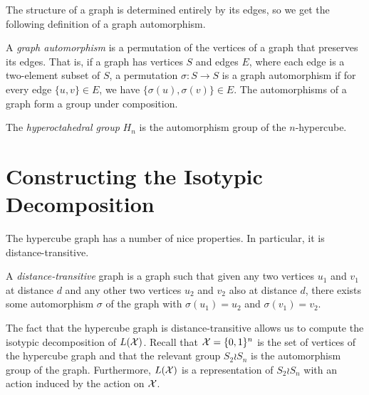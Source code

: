 \documentclass[cclicense]{hmcthesis}
\numberwithin{equation}{chapter}
\numberwithin{ucounter}{chapter}
\begin{document}
    The structure of a graph is determined entirely by its edges, so we get the
    following definition of a graph automorphism.
    \begin{definition}
        A \emph{graph automorphism} is a permutation of the vertices of a graph
        that preserves its edges.  That is, if a graph has vertices $S$ and
        edges $E$, where each edge is a two-element subset of $S$, a permutation
        $\sigma: S \to S$ is a graph automorphism if for every edge $\{u, v\}
        \in E$, we have \mbox{$\{\sigma(u), \sigma(v)\} \in E$}.  The automorphisms of
        a graph form a group under composition.
    \end{definition}

    \begin{definition}
        The \emph{hyperoctahedral group} $H_n$ is the automorphism group of the
        $n$-hypercube.
    \end{definition}

\section{Constructing the Isotypic Decomposition}
    \label{sec:construct-isotypic}
    The hypercube graph has a number of nice properties.  In particular, it is
    distance-transitive. 
    \begin{definition}
        A \emph{distance-transitive} graph is a graph such that given any two
        vertices $u_1$ and $v_1$ at distance $d$ and any other two vertices
        $u_2$ and $v_2$ also at distance $d$, there exists some automorphism
        $\sigma$ of the graph with $\sigma(u_1) = u_2$ and $\sigma(v_1) = v_2$.
    \end{definition}
    The fact that the hypercube graph is distance-transitive allows us to
    compute the isotypic decomposition of $L(\mathcal{X})$.  Recall that $\mathcal{X} = \{0,
    1\}^n$ is the set of vertices of the hypercube graph and that the relevant
    group $S_2 \wr S_n$ is the automorphism group of the graph.  Furthermore,
    $L(\mathcal{X})$ is a representation of $S_2 \wr S_n$ with an action induced by the
    action on $\mathcal{X}$.
\end{document}
